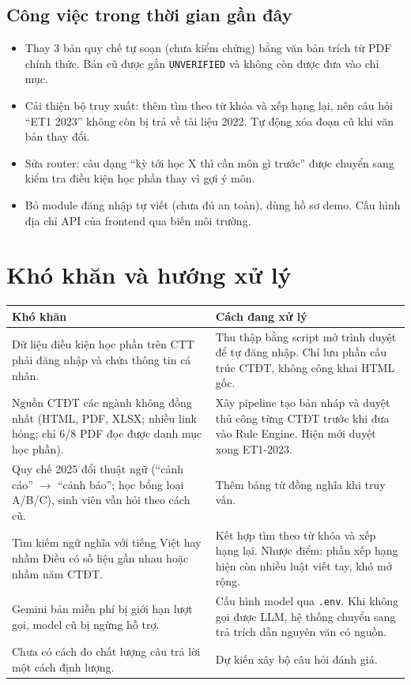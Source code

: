 \documentclass[11pt,a4paper]{article}
\newcommand{\code}[1]{\texttt{#1}}
\begin{document}
\subsection{Công việc trong thời gian gần đây}
\begin{itemize}
  \item Thay 3 bản quy chế tự soạn (chưa kiểm chứng) bằng văn bản trích từ PDF chính thức.
        Bản cũ được gắn \code{UNVERIFIED} và không còn được đưa vào chỉ mục.
  \item Cải thiện bộ truy xuất: thêm tìm theo từ khóa và xếp hạng lại, nên câu hỏi
        ``ET1 2023'' không còn bị trả về tài liệu 2022. Tự động xóa đoạn cũ khi văn bản thay đổi.
  \item Sửa router: câu dạng ``kỳ tới học X thì cần môn gì trước'' được chuyển sang kiểm tra
        điều kiện học phần thay vì gợi ý môn.
  \item Bỏ module đăng nhập tự viết (chưa đủ an toàn), dùng hồ sơ demo. Cấu hình địa chỉ
        API của frontend qua biến môi trường.
\end{itemize}

\section{Khó khăn và hướng xử lý}

\begin{tabularx}{\linewidth}{@{}>{\raggedright\arraybackslash}p{5.2cm}X@{}}
\toprule
\textbf{Khó khăn} & \textbf{Cách đang xử lý} \\
\midrule
Dữ liệu điều kiện học phần trên CTT phải đăng nhập và chứa thông tin cá nhân. &
  Thu thập bằng script mở trình duyệt để tự đăng nhập. Chỉ lưu phần cấu trúc CTĐT,
  không công khai HTML gốc. \\
Nguồn CTĐT các ngành không đồng nhất (HTML, PDF, XLSX; nhiều link hỏng; chỉ 6/8 PDF
  đọc được danh mục học phần). &
  Xây pipeline tạo bản nháp và duyệt thủ công từng CTĐT trước khi đưa vào Rule Engine.
  Hiện mới duyệt xong ET1-2023. \\
Quy chế 2025 đổi thuật ngữ (``cảnh cáo'' $\rightarrow$ ``cảnh báo''; học bổng loại A/B/C),
  sinh viên vẫn hỏi theo cách cũ. &
  Thêm bảng từ đồng nghĩa khi truy vấn. \\
Tìm kiếm ngữ nghĩa với tiếng Việt hay nhầm Điều có số liệu gần nhau hoặc nhầm năm CTĐT. &
  Kết hợp tìm theo từ khóa và xếp hạng lại. Nhược điểm: phần xếp hạng hiện còn nhiều
  luật viết tay, khó mở rộng. \\
Gemini bản miễn phí bị giới hạn lượt gọi, model cũ bị ngừng hỗ trợ. &
  Cấu hình model qua \code{.env}. Khi không gọi được LLM, hệ thống chuyển sang trả
  trích dẫn nguyên văn có nguồn. \\
Chưa có cách đo chất lượng câu trả lời một cách định lượng. &
  Dự kiến xây bộ câu hỏi đánh giá. \\
\bottomrule
\end{tabularx}
\end{document}
